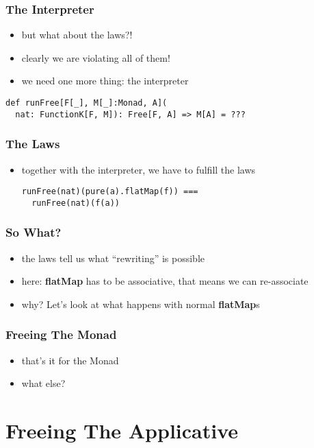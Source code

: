 \documentclass{beamer}
\begin{document}
\begin{frame}[fragile]
  \frametitle{The Interpreter}
  \begin{itemize}
  \item but what about the laws?!
  \item clearly we are violating all of them!
  \item we need one more thing: the interpreter
  \end{itemize}
  \begin{verbatim}
def runFree[F[_], M[_]:Monad, A](
  nat: FunctionK[F, M]): Free[F, A] => M[A] = ???
  \end{verbatim}
\end{frame}

\begin{frame}[fragile]
  \frametitle{The Laws}
  \begin{itemize}
  \item together with the interpreter, we have to fulfill the laws
    \begin{verbatim}
runFree(nat)(pure(a).flatMap(f)) ===
  runFree(nat)(f(a))
    \end{verbatim}
  \end{itemize}
\end{frame}

\begin{frame}
  \frametitle{So What?}
  \begin{itemize}
  \item the laws tell us what ``rewriting'' is possible
  \item here: \textbf{flatMap} has to be associative, that means we can re-associate
  \item why? Let's look at what happens with normal \textbf{flatMap}s
  \end{itemize}
\end{frame}

\begin{frame}
  \frametitle{Freeing The Monad}
  \begin{itemize}
  \item that's it for the Monad
  \item what else?
  \end{itemize}
\end{frame}

\section{Freeing The Applicative}\label{sec:free-applicative}
\end{document}
